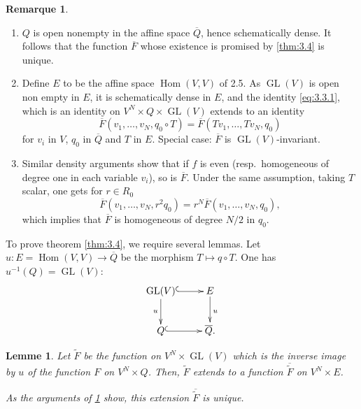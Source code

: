 \documentclass[11pt,a4paper]{article}
\theoremstyle{plain}
\newtheorem{lemma}[theorem]{Lemme}
\theoremstyle{definition}
\newtheorem{remark}[theorem]{Remarque}
\DeclareMathOperator{\Hom}{Hom}
\DeclareMathOperator{\GL}{GL}
\begin{document}
\begin{remark}~\label{rem:3.5}
\begin{enumerate}[label=(\roman*)]
\item $Q$ is open nonempty in the affine space $\overline{Q}$, hence schematically dense. It follows that the function $\overline{F}$ whose existence is promised by \ref{thm:3.4} is unique.

\item Define $E$ to be the affine space $\Hom(V,V)$ of 2.5. As $\GL(V)$ is open non empty in $E$, it is schematically dense in $E$, and the identity \eqref{eq:3.3.1}, which is an identity on $V^N \times Q \times \GL(V)$ extends to an identity
\begin{equation}\label{eq:3.5.1}
\overline{F}(v_1,\dots,v_N, q_0 \circ T) = \overline{F}(Tv_1,\dots,Tv_N, q_0)
\end{equation}
for $v_i$ in $V$, $q_0$ in $\overline{Q}$ and $T$ in $E$. Special case: $\overline{F}$ is $\GL(V)$-invariant.

\item Similar density arguments show that if $f$ is even (resp.\ homogeneous of degree one in each variable $v_i$), so is $\overline{F}$. Under the same assumption, taking $T$ scalar, one gets for $r \in R_0$
\[
\overline{F}(v_1,\dots,v_N, r^2 q_0) = r^N \overline{F}(v_1,\dots,v_N, q_0),
\]
which implies that $\overline{F}$ is homogeneous of degree $N/2$ in $q_0$.
\end{enumerate}
\end{remark}

To prove theorem \ref{thm:3.4}, we require several lemmas. Let $u : E = \Hom(V,V) \to \overline{Q}$ be the morphism $T \mapsto q \circ T$. One has $u^{-1}(Q) = \GL(V)$:
\begin{equation}\label{eq:3.5.2}
\xymatrix{
\GL(V) \ar@{^{(}->}[r] \ar[d]_{u} & E \ar[d]^{u} \\
Q \ar@{^{(}->}[r] & \overline{Q}.
}
\end{equation}

\begin{lemma}\label{lem:3.6}
Let $\widetilde{F}$ be the function on $V^N \times \GL(V)$ which is the inverse image by $u$ of the function $F$ on $V^N \times Q$. Then, $\widetilde{F}$ extends to a function $\overline{\widetilde{F}}$ on $V^N \times E$.

As the arguments of \ref{rem:3.5} show, this extension $\overline{\widetilde{F}}$ is unique.
\end{lemma}
\end{document}
